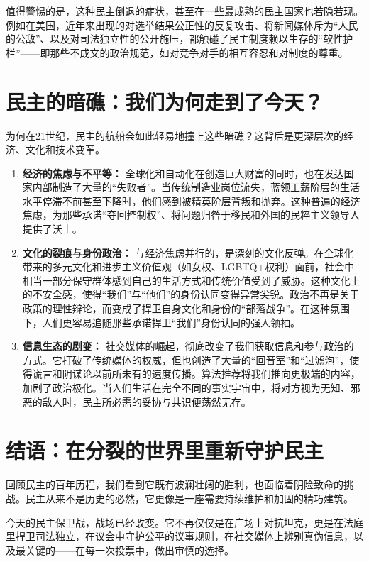 \documentclass[a5paper, 11pt, openany]{ctexbook}
\begin{document}
值得警惕的是，这种民主倒退的症状，甚至在一些最成熟的民主国家也若隐若现。例如在美国，近年来出现的对选举结果公正性的反复攻击、将新闻媒体斥为“人民的公敌”、以及对司法独立性的公开施压，都触碰了民主制度赖以生存的“软性护栏”——即那些不成文的政治规范，如对竞争对手的相互容忍和对制度的尊重。

\section{民主的暗礁：我们为何走到了今天？}

为何在21世纪，民主的航船会如此轻易地撞上这些暗礁？这背后是更深层次的经济、文化和技术变革。

\begin{enumerate}
    \item \textbf{经济的焦虑与不平等：} 全球化和自动化在创造巨大财富的同时，也在发达国家内部制造了大量的“失败者”。当传统制造业岗位流失，蓝领工薪阶层的生活水平停滞不前甚至下降时，他们感到被精英阶层背叛和抛弃。这种普遍的经济焦虑，为那些承诺“夺回控制权”、将问题归咎于移民和外国的民粹主义领导人提供了沃土。
    \item \textbf{文化的裂痕与身份政治：} 与经济焦虑并行的，是深刻的文化反弹。在全球化带来的多元文化和进步主义价值观（如女权、LGBTQ+权利）面前，社会中相当一部分保守群体感到自己的生活方式和传统价值受到了威胁。这种文化上的不安全感，使得“我们”与“他们”的身份认同变得异常尖锐。政治不再是关于政策的理性辩论，而变成了捍卫自身文化和身份的“部落战争”。在这种氛围下，人们更容易追随那些承诺捍卫“我们”身份认同的强人领袖。
    \item \textbf{信息生态的剧变：} 社交媒体的崛起，彻底改变了我们获取信息和参与政治的方式。它打破了传统媒体的权威，但也创造了大量的“回音室”和“过滤泡”，使得谎言和阴谋论以前所未有的速度传播。算法推荐将我们推向更极端的内容，加剧了政治极化。当人们生活在完全不同的事实宇宙中，将对方视为无知、邪恶的敌人时，民主所必需的妥协与共识便荡然无存。
\end{enumerate}

\section*{结语：在分裂的世界里重新守护民主}

回顾民主的百年历程，我们看到它既有波澜壮阔的胜利，也面临着阴险致命的挑战。民主从来不是历史的必然，它更像是一座需要持续维护和加固的精巧建筑。

今天的民主保卫战，战场已经改变。它不再仅仅是在广场上对抗坦克，更是在法庭里捍卫司法独立，在议会中守护公平的议事规则，在社交媒体上辨别真伪信息，以及最关键的——在每一次投票中，做出审慎的选择。
\end{document}
